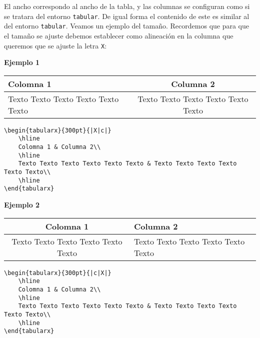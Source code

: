 	
	El ancho correspondo al ancho de la tabla, y las columnas se configuran como si se tratara del entorno \verb|tabular|. De igual forma el contenido de este es similar al del entorno \verb|tabular|. Veamos un ejemplo del tamaño. Recordemos que para que el tamaño se ajuste debemos establecer como alineación en la columna que queremos que se ajuste la letra \verb|X|:
	
	\textbf{Ejemplo 1}
	
	\begin{center}
		\begin{tabularx}{300pt}{|X|c|}
			\hline
			Colomna 1 & Columna 2\\
			\hline		
			Texto Texto Texto Texto Texto Texto & Texto Texto Texto Texto Texto Texto\\
			\hline	
		\end{tabularx}
	\end{center}
	
	\begin{myquote}
		\begin{lstlisting}
\begin{tabularx}{300pt}{|X|c|}
	\hline
	Colomna 1 & Columna 2\\
	\hline		
	Texto Texto Texto Texto Texto Texto & Texto Texto Texto Texto Texto Texto\\
	\hline	
\end{tabularx}			
		\end{lstlisting}
	\end{myquote}
	
	\textbf{Ejemplo 2}
	
	\begin{center}
		\begin{tabularx}{300pt}{|c|X|}
			\hline
			Colomna 1 & Columna 2\\
			\hline		
			Texto Texto Texto Texto Texto Texto & Texto Texto Texto Texto Texto Texto\\
			\hline	
		\end{tabularx}
	\end{center}
	
	\begin{myquote}
		\begin{lstlisting}
\begin{tabularx}{300pt}{|c|X|}
	\hline
	Colomna 1 & Columna 2\\
	\hline		
	Texto Texto Texto Texto Texto Texto & Texto Texto Texto Texto Texto Texto\\
	\hline	
\end{tabularx}			
		\end{lstlisting}
	\end{myquote}
	
